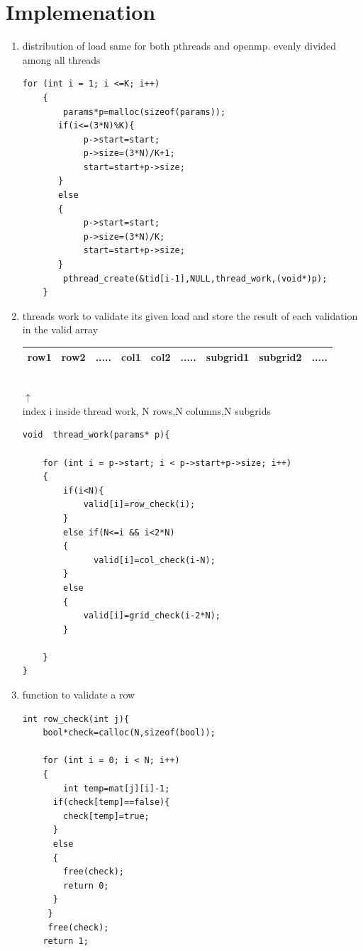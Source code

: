 \documentclass[10pt,a4paper]{article}
\begin{document}
\section{Implemenation}
\begin{enumerate}
\item distribution of load same for both pthreads and openmp.
evenly divided among all threads
\begin{lstlisting}[style=myStyle]
for (int i = 1; i <=K; i++)
    {
        params*p=malloc(sizeof(params));
       if(i<=(3*N)%K){
            p->start=start;
            p->size=(3*N)/K+1;
            start=start+p->size;
       }
       else
       {
            p->start=start;
            p->size=(3*N)/K;
            start=start+p->size;
       }
        pthread_create(&tid[i-1],NULL,thread_work,(void*)p);
    }
\end{lstlisting}
\item threads work to validate its given load and store the result of each validation in the valid array
\\

   
\begin{tabular}{| *{9}{c |}}
\hline
row1 &row2 &..... &col1&col2&.....& subgrid1 & subgrid2 &.....\\
\hline
\end{tabular}
\\
$\uparrow$\\
index i inside thread work, N rows,N columns,N subgrids
\begin{lstlisting}[style=myStyle]
void  thread_work(params* p){

    for (int i = p->start; i < p->start+p->size; i++)
    {
        if(i<N){
            valid[i]=row_check(i);
        }
        else if(N<=i && i<2*N)
        {
              valid[i]=col_check(i-N);
        }
        else
        {
            valid[i]=grid_check(i-2*N);
        }
        
    }
}
\end{lstlisting}
\item function to validate a row
\begin{lstlisting}[style=myStyle]
int row_check(int j){
    bool*check=calloc(N,sizeof(bool));

    for (int i = 0; i < N; i++)
    {
        int temp=mat[j][i]-1;
      if(check[temp]==false){
        check[temp]=true;
      }
      else
      {
        free(check);
        return 0;
      }
     }
     free(check);
    return 1;
    


\end{lstlisting}
\end{enumerate}
\end{document}
